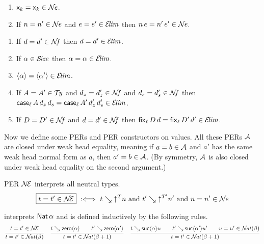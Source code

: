 \documentclass[acmlarge,review,anonymous]{acmart}\settopmatter{printfolios=true}
\begin{document}
\begin{lemma}
  \label{lem:closne}
  \bla
  \begin{enumerate}
  \item $\lev k = \lev k \in \NE$.
  \item If\/ $n = n' \in \NE$ and $e = e' \in \ELIM$ then $n\,e = n'\,e' \in \NE$.
  \end{enumerate}
\end{lemma}

\begin{lemma}
  \label{lem:closelim}
  \bla
  \begin{enumerate}
  \item If\/ $d = d' \in \NF$ then $d = d' \in \ELIM$.
  \item If\/ $\alpha \in \SIZE$ then $\alpha = \alpha \in \ELIM$.
  \item $\ann \alpha = \ann{\alpha'} \in \ELIM$.
  \item If\/ $A = A' \in \TY$ and $d_z = d_z' \in \NF$ and $d_s = d_s' \in \NF$
        then $\case[\ell] A {d_z}{d_s} = \case[\ell]{A'}{d_z'}{d_s'} \in \ELIM$.
  \item If\/ $D = D' \in \NF$ and $d = d' \in \NF$ then $\fix[\ell] D d = \fix[\ell]{D'}{d'} \in \ELIM$.
  \end{enumerate}
\end{lemma}

Now we define some PERs and PER constructors on values.  All these PERs $\A$ are closed under weak head equality, meaning if $a = b \in \A$ and $a'$ has the same weak head normal form as $a$, then $a' = b \in \A$.  (By symmetry, $\A$ is also closed under weak head equality on the second argument.)

PER $\NEE$ interprets all neutral types.
\[
\fbox{$t = t' \in \NEE$} \defas
  t \evalsto \up T n \mand t' \evalsto \up{T'}{n'} \mand
  n = n' \in \NE
\]

\fbox{$\NAT(\alpha)$} interprets $\Nat \alpha$ and is defined inductively by the following rules.
\begin{gather*}
  \ru{%
      t = t' \in \NEE
    }{t = t' \in \NAT(\beta)}
\quad
  \ru{t \evalsto \zero \alpha \qquad
      t' \evalsto \zero{\alpha'}
    }{t = t' \in \NAT(\beta+1)}
\quad
  \ru{t \evalsto \suc \alpha u \qquad
      t' \evalsto \suc {\alpha'} {u'} \qquad
      u = u' \in \NAT(\beta)
    }{t = t' \in \NAT(\beta+1)}
\end{gather*}
\end{document}
